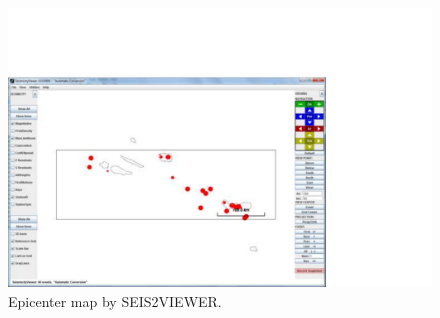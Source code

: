 %
%
%
\begin{figure}
\centerline{\includegraphics[width=0.9\linewidth]{fig/seis2viewer}}
\caption{Epicenter map by SEIS2VIEWER.}
\label{fig:seis2viewer}
\end{figure}

%



